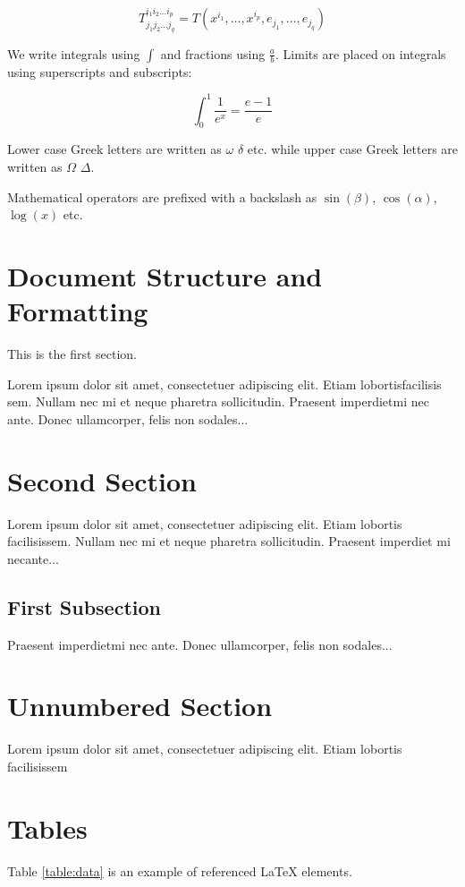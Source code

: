 \documentclass[12pt, letterpaper]{article}
\begin{document}
$$T^{i_1 i_2 \dots i_p}_{j_1 j_2 \dots j_q} = T(x^{i_1},\dots,x^{i_p},e_{j_1},\dots,e_{j_q})$$

We write integrals using $\int$ and fractions using $\frac{a}{b}$. Limits are placed on integrals using superscripts and subscripts:

$$\int_0^1 \frac{1}{e^x} =  \frac{e-1}{e}$$

Lower case Greek letters are written as $\omega$ $\delta$ etc. while upper case Greek letters are written as $\Omega$ $\Delta$.

Mathematical operators are prefixed with a backslash as $\sin(\beta)$, $\cos(\alpha)$, $\log(x)$ etc.

\section{Document Structure and Formatting}

This is the first section.

Lorem  ipsum  dolor  sit  amet,  consectetuer  adipiscing
elit.   Etiam  lobortisfacilisis sem.  Nullam nec mi et
neque pharetra sollicitudin.  Praesent imperdietmi nec ante.
Donec ullamcorper, felis non sodales...

\section{Second Section}

Lorem ipsum dolor sit amet, consectetuer adipiscing elit.
Etiam lobortis facilisissem.  Nullam nec mi et neque pharetra
sollicitudin.  Praesent imperdiet mi necante...

\subsection{First Subsection}
Praesent imperdietmi nec ante. Donec ullamcorper, felis non sodales...

\section*{Unnumbered Section}
Lorem ipsum dolor sit amet, consectetuer adipiscing elit.
Etiam lobortis facilisissem

\section{Tables}
Table \ref{table:data} is an example of referenced \LaTeX{} elements.
\end{document}
